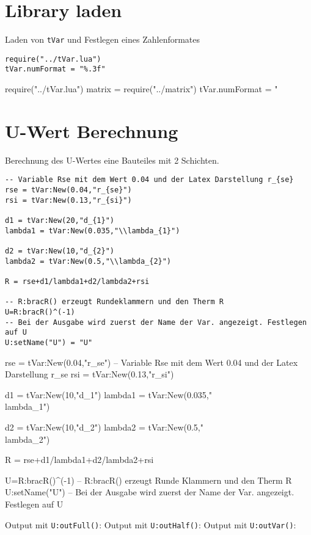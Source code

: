 


\section{Library laden}
Laden von \lstinline$tVar$ und Festlegen eines Zahlenformates
\begin{lstlisting}
require("../tVar.lua")
tVar.numFormat = "%.3f"
\end{lstlisting}
\begin{luacode*}
	require("../tVar.lua")
	matrix = require("../matrix")
	tVar.numFormat = "%
\end{luacode*}
\section{U-Wert Berechnung}
Berechnung des U-Wertes eine Bauteiles mit 2 Schichten.
\begin{lstlisting}
-- Variable Rse mit dem Wert 0.04 und der Latex Darstellung r_{se}
rse = tVar:New(0.04,"r_{se}")
rsi = tVar:New(0.13,"r_{si}")

d1 = tVar:New(20,"d_{1}")
lambda1 = tVar:New(0.035,"\\lambda_{1}")

d2 = tVar:New(10,"d_{2}")
lambda2 = tVar:New(0.5,"\\lambda_{2}")

R = rse+d1/lambda1+d2/lambda2+rsi

-- R:bracR() erzeugt Rundeklammern und den Therm R
U=R:bracR()^(-1)
-- Bei der Ausgabe wird zuerst der Name der Var. angezeigt. Festlegen auf U
U:setName("U") = "U"
\end{lstlisting}
\begin{luacode*}
	rse = tVar:New(0.04,"r_{se}") -- Variable Rse mit dem Wert 0.04 und der Latex Darstellung r_{se}
	rsi = tVar:New(0.13,"r_{si}")

	d1 = tVar:New(10,"d_{1}")
	lambda1 = tVar:New(0.035,"\\lambda_{1}")

	d2 = tVar:New(10,"d_{2}")
	lambda2 = tVar:New(0.5,"\\lambda_{2}")

	R = rse+d1/lambda1+d2/lambda2+rsi

	U=R:bracR()^(-1) -- R:bracR() erzeugt Runde Klammern und den Therm R
	U:setName("U") -- Bei der Ausgabe wird zuerst der Name der Var. angezeigt. Festlegen auf U
\end{luacode*}
Output mit \lstinline{U:outFull()}:
Output mit \lstinline{U:outHalf()}:
Output mit \lstinline{U:outVar()}:
